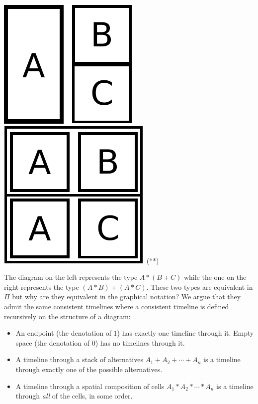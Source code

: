 \documentclass{article}
\begin{document}
\begin{center}
\hfill 
\includegraphics[scale=0.3]{images/distrib-1}
\qquad \qquad \qquad \qquad \qquad 
\includegraphics[scale=0.3]{images/distrib-2}
\hfill (**)
\end{center}

The diagram on the left represents the type $A * (B + C)$ while the
one on the right represents the type $(A * B) + (A * C)$. These two
types are equivalent in $\Pi$ but why are they equivalent in the
graphical notation? We argue that they admit the same consistent
timelines where a consistent timeline is defined recursively on the
structure of a diagram:
\begin{itemize}
\item An endpoint (the denotation of $1$) has exactly one timeline
  through it.  Empty space (the denotation of $0$) has no timelines
  through it.
\item A timeline through a stack of alternatives
  $A_1 + A_2 + \cdots + A_n$ is a timeline through exactly one of the
  possible alternatives.
\item A timeline through a spatial composition of cells
  $A_1 * A_2 * \cdots * A_n$ is a timeline through \emph{all} of the
  cells, in some order.
\end{itemize}
\end{document}
